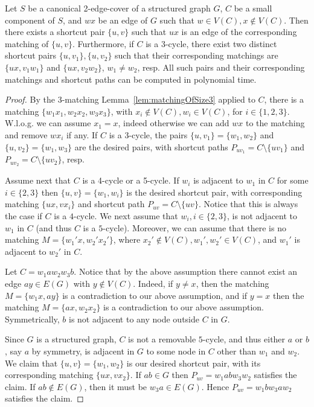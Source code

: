 \documentclass{theoretics}
\begin{document}
\begin{lemma}\label{lem:shortcutPair}
    Let $S$ be a canonical 2-edge-cover of a structured graph $G$, $C$ be a small component of $S$, and $wx$ be an edge of $G$ such that $w\in V(C), x\notin V(C)$. Then there exists a shortcut pair $\{u, v\}$ such that $ux$ is an edge of the corresponding matching of $\{u, v\}$. Furthermore, if $C$ is a 3-cycle, there exist two distinct shortcut pairs $\{u, v_1\}, \{u, v_2\}$ such that their corresponding matchings are $\{ux, v_1w_1\}$ and $\{ux, v_2w_2\}$, $w_1\neq w_2$, resp. All such pairs and their corresponding matchings and shortcut paths can be computed in polynomial time.
\end{lemma}
\begin{proof}
    By the 3-matching Lemma~\ref{lem:matchingOfSize3} applied to $C$, there is a matching $\{w_1x_1, w_2x_2, w_3x_3\}$, with $x_i\notin V(C), w_i\in V(C)$, for $i\in\{1, 2, 3\}$. W.l.o.g. we can assume $x_1=x$, indeed otherwise we can add $wx$ to the matching and remove $wx_i$ if any. If $C$ is a 3-cycle, the pairs $\{u, v_1\}=\{w_1, w_2\}$ and $\{u, v_2\}=\{w_1, w_3\}$ are the desired pairs, with shortcut paths $P_{uv_1}=C\setminus\{uv_1\}$ and $P_{uv_2}=C\setminus\{uv_2\}$, resp. 
    
    Assume next that $C$ is a 4-cycle or a 5-cycle. If $w_i$ is adjacent to $w_1$ in $C$ for some $i\in\{2, 3\}$ then $\{u, v\}=\{w_1, w_i\}$ is the desired shortcut pair, with corresponding matching $\{ux, vx_i\}$ and shortcut path $P_{uv}=C\setminus\{uv\}$. Notice that this is always the case if $C$ is a $4$-cycle. We next assume that $w_i, i\in\{2, 3\}$, is not adjacent to $w_1$ in $C$ (and thus $C$ is a $5$-cycle). Moreover, we can assume that there is no matching $M = \{w_1'x, w_2'x_2'\}$, where $x_2'\notin V(C), w_1', w_2'\in V(C)$, and $w_1'$ is adjacent to $w_2'$ in $C$.
    
    Let $C=w_1aw_2w_3b$. Notice that by the above assumption there cannot exist an edge $ay\in E(G)$ with $y\notin V(C)$. Indeed, if $y\neq x$, then the matching $M = \{w_1x, ay\}$ is a contradiction to our above assumption, and if $y=x$ then the matching $M = \{ax, w_2x_2\}$ is a contradiction to our above assumption. Symmetrically, $b$ is not adjacent to any node outside $C$ in $G$.

    Since $G$ is a structured graph, $C$ is not a removable $5$-cycle, and thus either $a$ or $b$, say $a$ by symmetry, is adjacent in $G$ to some node in $C$ other than $w_1$ and $w_2$. We claim that $\{u, v\}=\{w_1, w_2\}$ is our desired shortcut pair, with its corresponding matching $\{ux, vx_2\}$. If $ab\in G$ then $P_{uv}=w_1abw_3w_2$ satisfies the claim. If $ab\notin E(G)$, then it must be $w_3a\in E(G)$. Hence  $P_{uv}=w_1bw_3aw_2$ satisfies the claim.
\end{proof}
\end{document}
